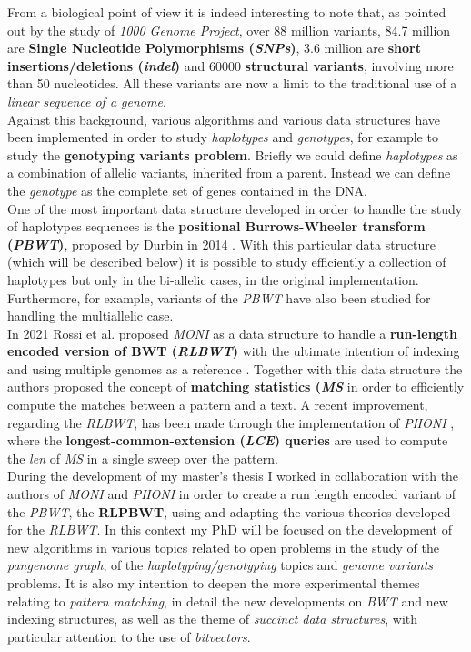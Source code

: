 \documentclass[a4paper,11pt, oneside]{article}
\begin{document}
From a biological point of view it is indeed interesting to note that, as
pointed out by the study of \textit{1000 Genome Project}, over 88 million
variants, 84.7 million are \textbf{Single Nucleotide Polymorphisms
  (\textit{SNPs})}, 3.6 million are \textbf{short insertions/deletions
  (\textit{indel})} and 60000 \textbf{structural variants}, involving more than
50 nucleotides. All these variants are now a limit to the traditional use of a
\textit{linear sequence of a genome}.\\
Against this background, various algorithms and various data structures have
been implemented in order to study \textit{haplotypes} and
\textit{genotypes}, for example to study the \textbf{genotyping variants
  problem}. Briefly we could define \textit{haplotypes} as a combination 
of allelic variants, inherited from a parent. Instead we can define the
\textit{genotype} as the complete set of genes contained in the DNA.\\ 
One of the most important data structure developed in order to handle the study
of haplotypes sequences is the \textbf{positional Burrows-Wheeler transform
  (\textit{PBWT})}, proposed by Durbin in 2014 \cite{pbwt_durbin}. With this
particular data structure (which will be described below) it is possible to
study efficiently a collection of haplotypes but only in the bi-allelic cases,
in the original implementation. Furthermore, for example, variants 
of the \textit{PBWT} have also been studied for handling the multiallelic
case. \\ 
In 2021 Rossi et al. proposed \textit{MONI} as a data structure to handle a
\textbf{run-length encoded version of BWT (\textit{RLBWT})} with the ultimate
intention of indexing and using multiple genomes as a reference
\cite{moni}. Together with this data structure the authors proposed the concept
of \textbf{matching statistics (\textit{MS}} in order to efficiently compute
the matches between a pattern and a text. A recent improvement, regarding the
\textit{RLBWT}, has been made through the implementation of \textit{PHONI}
\cite{phoni}, where the \textbf{longest-common-extension (\textit{LCE}) queries}
are used to compute the \textit{len} of \textit{MS} in a single sweep over the
pattern. \\ 
During the development of my master's thesis I worked in collaboration with the
authors of \textit{MONI} and \textit{PHONI} in order to create a run length
encoded variant of the \textit{PBWT}, the \textbf{RLPBWT}, using and adapting
the various theories developed for the \textit{RLBWT}. In this context my PhD
will be focused on the development of new algorithms in
various topics related to open problems in the study of the \textit{pangenome
  graph}, of the \textit{haplotyping/genotyping} topics and \textit{genome
  variants} problems. It is also my intention to deepen the
more experimental themes 
relating to \textit{pattern matching}, in detail the new developments on
\textit{BWT} and new indexing structures, as well as the theme of
\textit{succinct data structures}, with particular attention to the use of
\textit{bitvectors}.
\end{document}
